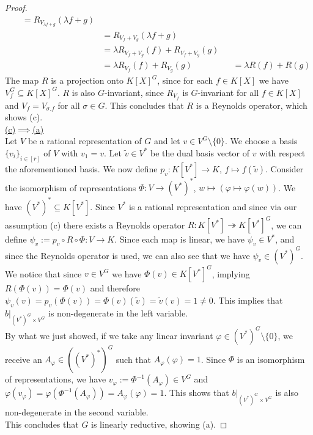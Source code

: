 \begin{proof}
\begin{equation}
\begin{aligned}
      &&= R_{V_{\lambda f +g}}(\lambda f+g)  \\
      &&&= R_{V_f +V_g}(\lambda f+g)  \\
      &&&= \lambda R_{V_f + V_g} (f) + R_{V_f + V_g}(g)  \\
      &&&= \lambda R_{V_f} (f) + R_{V_g}(g)
      &&= \lambda R(f) + R(g)
    \end{aligned}
  \end{equation}
  The map $R$ is a projection onto $K[X]^G$, since for each $f \in K[X]$ we have $V_f^G \subseteq K[X]^G$.
  $R$ is also $G$-invariant, since $R_{V_f}$ is $G$-invariant for all $f \in K[X]$ and  $V_f = V_{\sigma.f}$ for all $\sigma \in G$.
  This concludes that $R$ is a Reynolds operator, which shows (c).  \\
  \underline{(c)$\implies$(a)}  \\
  Let $V$ be a rational representation of $G$ and let $v \in V^G \setminus \{0\}$.
  We choose a basis $\{v_i\}_{i\in [r]}$ of $V$ with $v_1 = v$.
  Let $\tilde{v} \in V^\ast$ be the dual basis vector of $v$ with respect the aforementioned basis.
  We now define $p_v \colon K[V^\ast] \rightarrow K$, $f \mapsto f(\tilde{v})$.
  Consider the isomorphism of representations $\Phi \colon V \rightarrow (V^\ast)^\ast$, $w \mapsto (\varphi \mapsto \varphi (w))$.
  We have $(V^\ast)^\ast \subseteq K[V^\ast]$.
  Since $V^\ast$ is a rational representation and since via our assumption (c) there exists a Reynolds operator $R \colon K[V^\ast] \twoheadrightarrow K[V^\ast]^G$, we can define $ \psi_v := p_v \circ R \circ \Phi \colon V \rightarrow K$.
  Since each map is linear, we have $\psi_v \in V^\ast$, and since the Reynolds operator is used, we can also see that we have $\psi_v \in (V^\ast)^G$.
  We notice that since $v \in V^G$ we have $\Phi (v) \in K[V^\ast]^G$, implying $R(\Phi(v))=\Phi(v)$ and therefore $\psi_v (v) = p_v (\Phi(v)) = \Phi (v) (\tilde{v}) = \tilde{v} (v) = 1 \neq 0$.
  This implies that $\left. b\right|_{(V^\ast)^G \times V^G}$ is non-degenerate in the left variable.\\
  By what we just showed, if we take any linear invariant $\varphi \in (V^\ast)^G \setminus \{0\}$, we receive an $A_\varphi \in ((V^\ast)^\ast)^G$ such that $A_\varphi(\varphi) = 1$.
  Since $\Phi$ is an isomorphism of representations, we have $v_\varphi := \Phi^{-1}(A_\varphi) \in V^G$ and $\varphi (v_\varphi) = \varphi (\Phi^{-1}(A_\varphi)) = A_\varphi (\varphi) = 1$.
  This shows that $\left. b\right|_{(V^\ast)^G \times V^G}$ is also non-degenerate in the second variable.\\
  This concludes that $G$ is linearly reductive, showing (a).
\end{proof}

